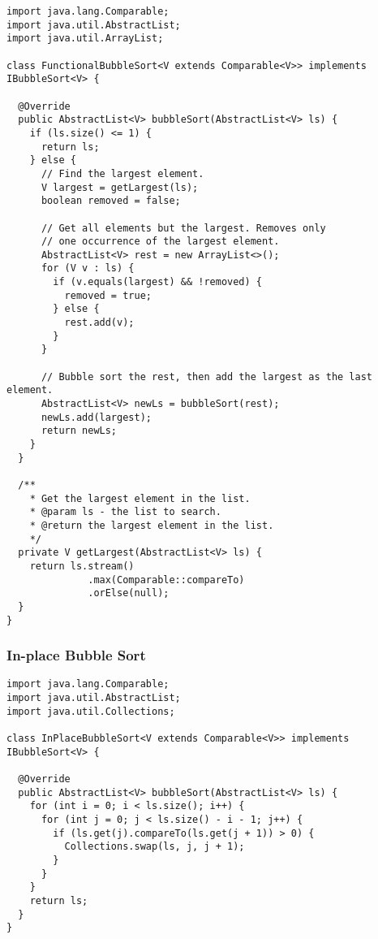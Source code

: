 \begin{lstlisting}[language=MyJava]
import java.lang.Comparable;
import java.util.AbstractList;
import java.util.ArrayList;

class FunctionalBubbleSort<V extends Comparable<V>> implements IBubbleSort<V> {

  @Override
  public AbstractList<V> bubbleSort(AbstractList<V> ls) {
    if (ls.size() <= 1) { 
      return ls; 
    } else {
      // Find the largest element.
      V largest = getLargest(ls);
      boolean removed = false;

      // Get all elements but the largest. Removes only
      // one occurrence of the largest element.
      AbstractList<V> rest = new ArrayList<>();
      for (V v : ls) {
        if (v.equals(largest) && !removed) { 
          removed = true; 
        } else { 
          rest.add(v); 
        }
      }

      // Bubble sort the rest, then add the largest as the last element.
      AbstractList<V> newLs = bubbleSort(rest);
      newLs.add(largest);
      return newLs;
    }
  }

  /**
    * Get the largest element in the list.
    * @param ls - the list to search.
    * @return the largest element in the list.
    */
  private V getLargest(AbstractList<V> ls) {
    return ls.stream()
              .max(Comparable::compareTo)
              .orElse(null);
  }
}
\end{lstlisting}

\subsubsection*{In-place Bubble Sort}
\begin{lstlisting}[language=MyJava]
import java.lang.Comparable;
import java.util.AbstractList;
import java.util.Collections;

class InPlaceBubbleSort<V extends Comparable<V>> implements IBubbleSort<V> {

  @Override
  public AbstractList<V> bubbleSort(AbstractList<V> ls) {
    for (int i = 0; i < ls.size(); i++) {
      for (int j = 0; j < ls.size() - i - 1; j++) {
        if (ls.get(j).compareTo(ls.get(j + 1)) > 0) {
          Collections.swap(ls, j, j + 1);
        }
      }
    }
    return ls;
  }
}
\end{lstlisting}

